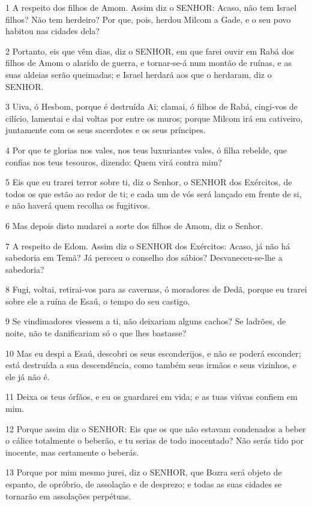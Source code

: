 \par 1 A respeito dos filhos de Amom. Assim diz o SENHOR: Acaso, não tem Israel filhos? Não tem herdeiro? Por que, pois, herdou Milcom a Gade, e o seu povo habitou nas cidades dela?
\par 2 Portanto, eis que vêm dias, diz o SENHOR, em que farei ouvir em Rabá dos filhos de Amom o alarido de guerra, e tornar-se-á num montão de ruínas, e as suas aldeias serão queimadas; e Israel herdará aos que o herdaram, diz o SENHOR.
\par 3 Uiva, ó Hesbom, porque é destruída Ai; clamai, ó filhos de Rabá, cingi-vos de cilício, lamentai e dai voltas por entre os muros; porque Milcom irá em cativeiro, juntamente com os seus sacerdotes e os seus príncipes.
\par 4 Por que te glorias nos vales, nos teus luxuriantes vales, ó filha rebelde, que confias nos teus tesouros, dizendo: Quem virá contra mim?
\par 5 Eis que eu trarei terror sobre ti, diz o Senhor, o SENHOR dos Exércitos, de todos os que estão ao redor de ti; e cada um de vós será lançado em frente de si, e não haverá quem recolha os fugitivos.
\par 6 Mas depois disto mudarei a sorte dos filhos de Amom, diz o Senhor.
\par 7 A respeito de Edom. Assim diz o SENHOR dos Exércitos: Acaso, já não há sabedoria em Temã? Já pereceu o conselho dos sábios? Desvaneceu-se-lhe a sabedoria?
\par 8 Fugi, voltai, retirai-vos para as cavernas, ó moradores de Dedã, porque eu trarei sobre ele a ruína de Esaú, o tempo do seu castigo.
\par 9 Se vindimadores viessem a ti, não deixariam alguns cachos? Se ladrões, de noite, não te danificariam só o que lhes bastasse?
\par 10 Mas eu despi a Esaú, descobri os seus esconderijos, e não se poderá esconder; está destruída a sua descendência, como também seus irmãos e seus vizinhos, e ele já não é.
\par 11 Deixa os teus órfãos, e eu os guardarei em vida; e as tuas viúvas confiem em mim.
\par 12 Porque assim diz o SENHOR: Eis que os que não estavam condenados a beber o cálice totalmente o beberão, e tu serias de todo inocentado? Não serás tido por inocente, mas certamente o beberás.
\par 13 Porque por mim mesmo jurei, diz o SENHOR, que Bozra será objeto de espanto, de opróbrio, de assolação e de desprezo; e todas as suas cidades se tornarão em assolações perpétuas.
